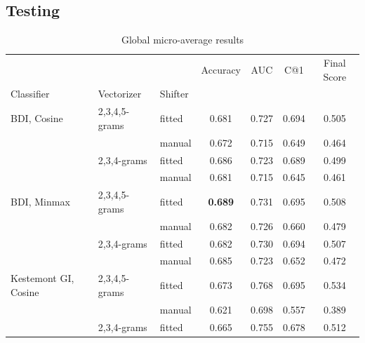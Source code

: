 \documentclass[
    hf,
]{ceurart}
\begin{document}
\subsection{Testing}

\begin{table}
    \caption{Global micro-average results}
    \label{tab:micro}
    \raggedright
    \begin{tabular}{lllcccc}
        \toprule
                                   &               &         & Accuracy       & AUC             & C@1            & Final Score    \\
        Classifier                 & Vectorizer    & Shifter &                &                 &                &                \\
        \midrule
        BDI, Cosine                & 2,3,4,5-grams & fitted  & 0.681          & 0.727           & 0.694          & 0.505          \\
                                   &               & manual  & 0.672          & 0.715           & 0.649          & 0.464          \\
                                   & 2,3,4-grams   & fitted  & 0.686          & 0.723           & 0.689          & 0.499          \\
                                   &               & manual  & 0.681          & 0.715           & 0.645          & 0.461          \\
        BDI, Minmax                & 2,3,4,5-grams & fitted  & \textbf{0.689} & 0.731           & 0.695          & 0.508          \\
                                   &               & manual  & 0.682          & 0.726           & 0.660          & 0.479          \\
                                   & 2,3,4-grams   & fitted  & 0.682          & 0.730           & 0.694          & 0.507          \\
                                   &               & manual  & 0.685          & 0.723           & 0.652          & 0.472          \\
        Kestemont GI, Cosine       & 2,3,4,5-grams & fitted  & 0.673          & 0.768           & 0.695          & 0.534          \\
                                   &               & manual  & 0.621          & 0.698           & 0.557          & 0.389          \\
                                   & 2,3,4-grams   & fitted  & 0.665          & 0.755           & 0.678          & 0.512          \\

\end{tabular}
\end{table}
\end{document}
